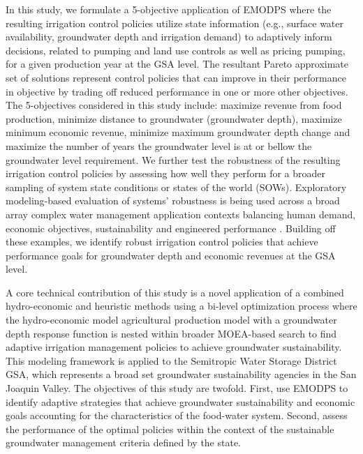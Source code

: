 \documentclass[a4paper,fleqn]{cas-sc}
\begin{document}
In this study, we formulate a 5-objective application of EMODPS where the resulting irrigation control policies utilize state information (e.g., surface water availability, groundwater depth and irrigation demand) to adaptively inform decisions, related to pumping and land use controls as well as pricing pumping, for a given production year at the GSA level. The resultant Pareto approximate set of solutions represent control policies that can improve in their performance in objective by trading off reduced performance in one or more other objectives. The 5-objectives considered in this study include: maximize revenue from food production, minimize distance to groundwater (groundwater depth), maximize minimum economic revenue, minimize maximum groundwater depth change and maximize the number of years the groundwater level is at or bellow the groundwater level requirement. We further test the robustness of the resulting irrigation control policies \citep{groves_robust_2019,lempert_making_2013,kasprzyk_many_2013} by assessing how well they perform for a broader sampling of system state conditions or states of the world (SOWs). Exploratory modeling-based evaluation of systems' robustness is being used across a broad array complex water management application contexts balancing human demand, economic objectives, sustainability and engineered performance \citep{graveline_combining_2020,huskova_screening_2016,miro_adaptive_2021,hadjimichael_defining_2020,shuai_robust_2022,moallemi_exploratory_2020,bertoni_discovering_2019,quinn_exploring_2018,trindade_deeply_2019,shuai_robust_2022}. Building off these examples, we identify robust irrigation control policies that achieve performance goals for groundwater depth and economic revenues at the GSA level. 

A core technical contribution of this study is a novel application of a combined hydro-economic and heuristic methods using a bi-level optimization process where the hydro-economic model agricultural production model with a groundwater depth response function is nested within broader MOEA-based search to find adaptive irrigation management policies to achieve groundwater sustainability. This modeling framework is applied to the Semitropic Water Storage District GSA, which represents a broad set groundwater sustainability agencies in the San Joaquin Valley. The objectives of this study are twofold. First, use EMODPS to identify adaptive strategies that achieve groundwater sustainability and economic goals accounting for the characteristics of the food-water system. Second, assess the performance of the optimal policies within the context of the sustainable groundwater management criteria defined by the state.
\end{document}
